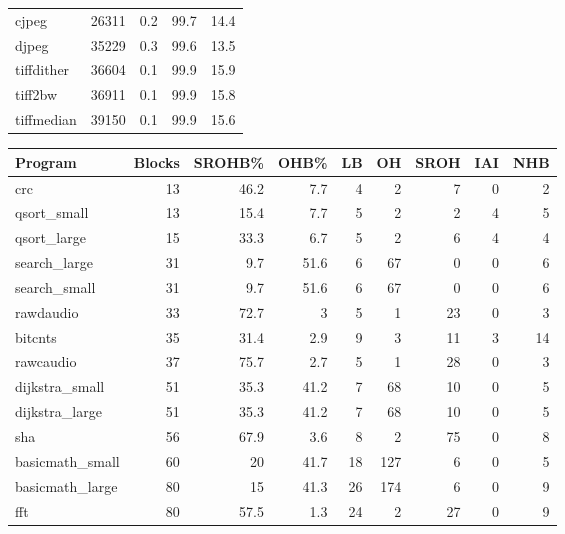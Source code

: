 \begin{tabular}{lrrrr}
 cjpeg           &   26311 &    0.2 &         99.7 &    14.4 \\
 djpeg           &   35229 &    0.3 &         99.6 &    13.5 \\
 tiffdither      &   36604 &    0.1 &         99.9 &    15.9 \\
 tiff2bw         &   36911 &    0.1 &         99.9 &    15.8 \\
 tiffmedian      &   39150 &    0.1 &         99.9 &    15.6 \\
\hline
\end{tabular}\begin{tabular}{lrrrrrrrr}
\hline
 Program         &   Blocks &   SROHB\% &   OHB\% &   LB &   OH &   SROH &   IAI &   NHB \\
\hline
 crc             &       13 &     46.2 &    7.7 &    4 &    2 &      7 &     0 &     2 \\
 qsort\_small     &       13 &     15.4 &    7.7 &    5 &    2 &      2 &     4 &     5 \\
 qsort\_large     &       15 &     33.3 &    6.7 &    5 &    2 &      6 &     4 &     4 \\
 search\_large    &       31 &      9.7 &   51.6 &    6 &   67 &      0 &     0 &     6 \\
 search\_small    &       31 &      9.7 &   51.6 &    6 &   67 &      0 &     0 &     6 \\
 rawdaudio       &       33 &     72.7 &    3   &    5 &    1 &     23 &     0 &     3 \\
 bitcnts         &       35 &     31.4 &    2.9 &    9 &    3 &     11 &     3 &    14 \\
 rawcaudio       &       37 &     75.7 &    2.7 &    5 &    1 &     28 &     0 &     3 \\
 dijkstra\_small  &       51 &     35.3 &   41.2 &    7 &   68 &     10 &     0 &     5 \\
 dijkstra\_large  &       51 &     35.3 &   41.2 &    7 &   68 &     10 &     0 &     5 \\
 sha             &       56 &     67.9 &    3.6 &    8 &    2 &     75 &     0 &     8 \\
 basicmath\_small &       60 &     20   &   41.7 &   18 &  127 &      6 &     0 &     5 \\
 basicmath\_large &       80 &     15   &   41.3 &   26 &  174 &      6 &     0 &     9 \\
 fft             &       80 &     57.5 &    1.3 &   24 &    2 &     27 &     0 &     9 \\

\end{tabular}
